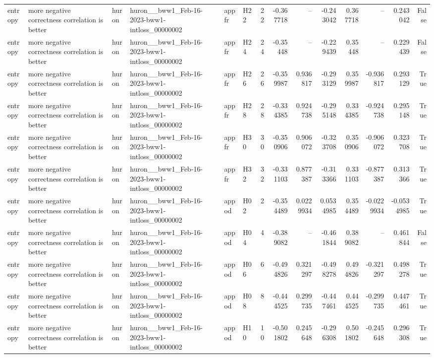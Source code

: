\begin{longtable}{llllllrrrrrrrr}
entropy & more negative correctness correlation is better & huron & huron\_\_bww1\_Feb-16-2023-bww1-intloss\_00000002 & appfr & H22 & 22 & -0.367718 & -- & -0.243042 & 0.367718 & -- & 0.243042 & False \\
entropy & more negative correctness correlation is better & huron & huron\_\_bww1\_Feb-16-2023-bww1-intloss\_00000002 & appfr & H24 & 24 & -0.35448 & -- & -0.229439 & 0.35448 & -- & 0.229439 & False \\
entropy & more negative correctness correlation is better & huron & huron\_\_bww1\_Feb-16-2023-bww1-intloss\_00000002 & appfr & H26 & 26 & -0.359987 & 0.936817 & -0.293129 & 0.359987 & -0.936817 & 0.293129 & True \\
entropy & more negative correctness correlation is better & huron & huron\_\_bww1\_Feb-16-2023-bww1-intloss\_00000002 & appfr & H28 & 28 & -0.334385 & 0.924738 & -0.295148 & 0.334385 & -0.924738 & 0.295148 & True \\
entropy & more negative correctness correlation is better & huron & huron\_\_bww1\_Feb-16-2023-bww1-intloss\_00000002 & appfr & H30 & 30 & -0.350906 & 0.906072 & -0.323708 & 0.350906 & -0.906072 & 0.323708 & True \\
entropy & more negative correctness correlation is better & huron & huron\_\_bww1\_Feb-16-2023-bww1-intloss\_00000002 & appfr & H32 & 32 & -0.331103 & 0.877387 & -0.313366 & 0.331103 & -0.877387 & 0.313366 & True \\
entropy & more negative correctness correlation is better & huron & huron\_\_bww1\_Feb-16-2023-bww1-intloss\_00000002 & appod & H02 & 2 & -0.354489 & 0.0229934 & 0.0534985 & 0.354489 & -0.0229934 & -0.0534985 & True \\
entropy & more negative correctness correlation is better & huron & huron\_\_bww1\_Feb-16-2023-bww1-intloss\_00000002 & appod & H04 & 4 & -0.389082 & -- & -0.461844 & 0.389082 & -- & 0.461844 & False \\
entropy & more negative correctness correlation is better & huron & huron\_\_bww1\_Feb-16-2023-bww1-intloss\_00000002 & appod & H06 & 6 & -0.494826 & 0.321297 & -0.498278 & 0.494826 & -0.321297 & 0.498278 & True \\
entropy & more negative correctness correlation is better & huron & huron\_\_bww1\_Feb-16-2023-bww1-intloss\_00000002 & appod & H08 & 8 & -0.444525 & 0.299735 & -0.447461 & 0.444525 & -0.299735 & 0.447461 & True \\
entropy & more negative correctness correlation is better & huron & huron\_\_bww1\_Feb-16-2023-bww1-intloss\_00000002 & appod & H10 & 10 & -0.501802 & 0.245648 & -0.296308 & 0.501802 & -0.245648 & 0.296308 & True \\

\end{longtable}
